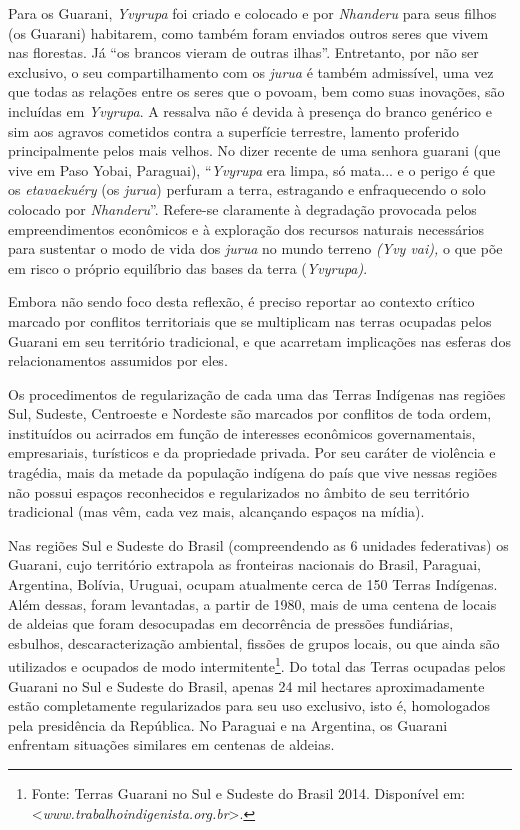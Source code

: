 Para os Guarani, \emph{Yvyrupa} foi criado e colocado e por
\emph{Nhanderu} para seus filhos (os Guarani) habitarem, como também
foram enviados outros seres que vivem nas florestas. Já ``os brancos
vieram de outras ilhas''. Entretanto, por não ser exclusivo, o seu
compartilhamento com os \emph{jurua} é também admissível, uma vez que
todas as relações entre os seres que o povoam, bem como suas inovações,
são incluídas em \emph{Yvyrupa}. A ressalva não é devida à presença do
branco genérico e sim aos agravos cometidos contra a superfície
terrestre, lamento proferido principalmente pelos mais velhos. No dizer
recente de uma senhora guarani (que vive em Paso Yobai, Paraguai),
``\emph{Yvyrupa} era limpa, só mata... e o perigo é que os
\emph{etavaekuéry} (os \emph{jurua}) perfuram a terra, estragando e
enfraquecendo o solo colocado por \emph{Nhanderu}''. Refere-se
claramente à degradação provocada pelos empreendimentos econômicos e à
exploração dos recursos naturais necessários para sustentar o modo de
vida dos \emph{jurua} no mundo terreno \emph{(Yvy vai),} o que põe em
risco o próprio equilíbrio das bases da terra (\emph{Yvyrupa)}.

Embora não sendo foco desta reflexão, é preciso reportar ao contexto
crítico marcado por conflitos territoriais que se multiplicam nas terras
ocupadas pelos Guarani em seu território tradicional, e que acarretam
implicações nas esferas dos relacionamentos assumidos por eles.

Os procedimentos de regularização de cada uma das Terras Indígenas nas
regiões Sul, Sudeste, Centroeste e Nordeste são marcados por conflitos
de toda ordem, instituídos ou acirrados em função de interesses
econômicos governamentais, empresariais, turísticos e da propriedade
privada. Por seu caráter de violência e tragédia, mais da metade da
população indígena do país que vive nessas regiões não possui espaços
reconhecidos e regularizados no âmbito de seu território tradicional
(mas vêm, cada vez mais, alcançando espaços na mídia).

Nas regiões Sul e Sudeste do Brasil (compreendendo as 6 unidades
federativas) os Guarani, cujo território extrapola as fronteiras
nacionais do Brasil, Paraguai, Argentina, Bolívia, Uruguai, ocupam
atualmente cerca de 150 Terras Indígenas. Além dessas, foram levantadas,
a partir de 1980, mais de uma centena de locais de aldeias que foram
desocupadas em decorrência de pressões fundiárias, esbulhos,
descaracterização ambiental, fissões de grupos locais, ou que ainda são
utilizados e ocupados de modo intermitente\footnote{Fonte: Terras
  Guarani no Sul e Sudeste do Brasil 2014. Disponível em:
  \textless{}\emph{www.trabalhoindigenista.org.br}\textgreater{}.}. Do
total das Terras ocupadas pelos Guarani no Sul e Sudeste do Brasil,
apenas 24 mil hectares aproximadamente estão completamente regularizados
para seu uso exclusivo, isto é, homologados pela presidência da
República. No Paraguai e na Argentina, os Guarani enfrentam situações
similares em centenas de aldeias.

